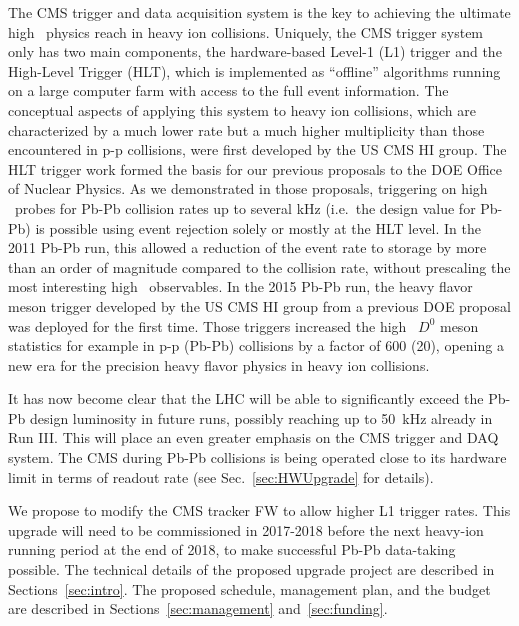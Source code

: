 The CMS trigger and data acquisition system is the key to achieving the ultimate high \pt\ physics reach in heavy ion collisions. Uniquely, the CMS trigger system only has two main components, the hardware-based Level-1 (L1) trigger and the High-Level Trigger (HLT), which is implemented as ``offline'' algorithms running on a large computer farm with access to the full event information.  
The conceptual aspects of applying this system to heavy ion collisions, which are characterized by a much lower rate but a much higher multiplicity than those encountered in p-p collisions, were first developed by the US CMS HI group. The HLT trigger work formed the basis for our previous proposals to the DOE Office of Nuclear Physics. As we demonstrated in those proposals, triggering on high \pt\ probes for Pb-Pb collision rates up to several kHz (i.e.\ the design value for Pb-Pb) is possible using event rejection solely or mostly at the HLT level. In the 2011 Pb-Pb run, this allowed a reduction of the event rate to storage by more than an order of magnitude compared to the collision rate, without prescaling the most interesting high \pt\ observables. In the 2015 Pb-Pb run, the heavy flavor meson trigger developed by the US CMS HI group from a previous DOE proposal was deployed for the first time. Those triggers increased the high \pt\ $D^0$ meson statistics for example in p-p (Pb-Pb) collisions by a factor of 600 (20), opening a new era for the precision heavy flavor physics in heavy ion collisions.

It has now become clear that the LHC will be able to significantly exceed the Pb-Pb design luminosity in future runs, possibly reaching up to 50~kHz already in Run III. This will place an even greater emphasis on the CMS trigger and DAQ system. The CMS during Pb-Pb collisions is being operated close to its hardware limit in terms of readout rate (see Sec.~\ref{sec:HWUpgrade} for details). 

We propose to modify the CMS tracker FW to allow higher L1 trigger rates. This upgrade will need to be commissioned in 2017-2018 before the next heavy-ion running period at the end of 2018, to make successful Pb-Pb data-taking possible. The technical details of the proposed upgrade project are described in Sections~\ref{sec:intro}. The proposed schedule, management plan, and the budget are described in Sections~\ref{sec:management} and~\ref{sec:funding}.

